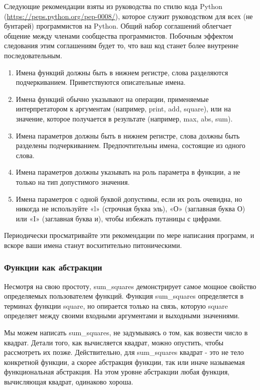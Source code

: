 Следующие рекомендации взяты из руководства по стилю кода Python (\url{https://peps.python.org/pep-0008/}), которое служит руководством для всех (не бунтарей) программистов на Python.
Общий набор соглашений облегчает общение между членами сообщества программистов.
Побочным эффектом следования этим соглашениям будет то, что ваш код станет более внутренне последовательным.
\begin{enumerate}
  \item Имена функций должны быть в нижнем регистре, слова разделяются подчеркиванием. Приветствуются описательные имена.
  \item Имена функций обычно указывают на операции, применяемые интерпретатором к аргументам (например, print, add, square), или на значение, которое получается в результате (например, max, abs, sum).
  \item Имена параметров должны быть в нижнем регистре, слова должны быть разделены подчеркиванием. Предпочтительны имена, состоящие из одного слова.
  \item Имена параметров должны указывать на роль параметра в функции, а не только на тип допустимого значения.
  \item Имена параметров с одной буквой допустимы, если их роль очевидна, но никогда не используйте «l» (строчная буква эль), «О» (заглавная буква О) или «I» (заглавная буква и), чтобы избежать путаницы с цифрами.
\end{enumerate}

Периодически просматривайте эти рекомендации по мере написания программ, и вскоре ваши имена станут восхитительно питоническими.

\subsubsection{Функции как абстракции}
Несмотря на свою простоту, sum\_squares демонстрирует самое мощное свойство определяемых пользователем функций. Функция sum\_squares определяется в терминах функции square, но опирается только на связь, которую square определяет между своими входными аргументами и выходными значениями.

Мы можем написать sum\_squares, не задумываясь о том, как возвести число в квадрат.
Детали того, как вычисляется квадрат, можно опустить, чтобы рассмотреть их позже. Действительно, для sum\_squares квадрат - это не тело конкретной функции, а скорее абстракция функции, так или иначе называемая функциональная абстракция.
На этом уровне абстракции любая функция, вычисляющая квадрат, одинаково хороша.

